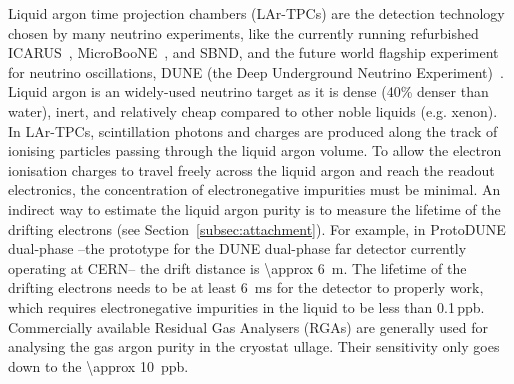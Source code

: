 \documentclass[a4paper,11pt]{article}
\begin{document}
Liquid argon time projection chambers (LAr-TPCs) are the detection technology chosen by many neutrino experiments, like the currently running refurbished ICARUS~\cite{Amoruso:2004ti}, MicroBooNE~\cite{Acciarri:2016smi}, and SBND, and the future world flagship experiment for neutrino oscillations, DUNE (the Deep Underground Neutrino Experiment)~\cite{duneTDRvol1,abi2017singlephase}. 
Liquid argon is an widely-used neutrino target as it is dense (40\% denser than water), inert, and relatively cheap compared to other noble liquids (e.g. xenon). 
In LAr-TPCs, scintillation photons and charges are produced along the track of ionising particles passing through the liquid argon volume. %
To allow the electron ionisation charges to travel freely across the liquid argon and reach the readout electronics, the concentration of electronegative impurities must be minimal.
An indirect way to estimate the liquid argon purity is to measure the lifetime of the drifting electrons (see Section~\ref{subsec:attachment}). 
For example, in ProtoDUNE dual-phase --the prototype for the DUNE dual-phase far detector currently operating at CERN-- the drift distance is \SI{\approx 6}{\m}. The lifetime of the drifting electrons needs to be at least \SI{6}{ms} for the detector to properly work, which requires electronegative impurities in the liquid to be less than 0.1\,ppb.
Commercially available Residual Gas Analysers (RGAs) are generally used for analysing the gas argon purity in the cryostat ullage. Their sensitivity only goes down to the \SI{\approx 10}{ppb}.%
\end{document}
